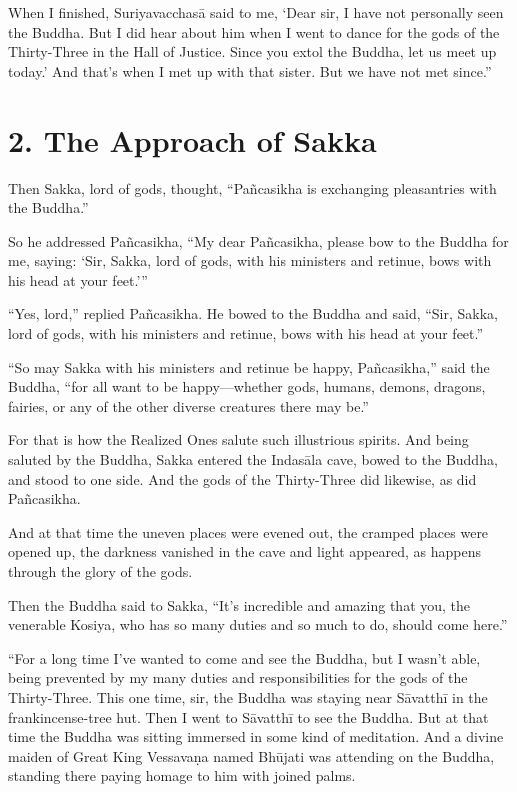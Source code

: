 \documentclass[12pt,openany]{book}%
\begin{document}
When I finished, \textsanskrit{Suriyavacchasā} said to me, ‘Dear sir, I have not personally seen the Buddha. But I did hear about him when I went to dance for the gods of the Thirty-Three in the Hall of Justice. Since you extol the Buddha, let us meet up today.’ And that’s when I met up with that sister. But we have not met since.” 

\section*{2. The Approach of Sakka }

Then Sakka, lord of gods, thought, “\textsanskrit{Pañcasikha} is exchanging pleasantries with the Buddha.” 

So he addressed \textsanskrit{Pañcasikha}, “My dear \textsanskrit{Pañcasikha}, please bow to the Buddha for me, saying: ‘Sir, Sakka, lord of gods, with his ministers and retinue, bows with his head at your feet.’” 

“Yes, lord,” replied \textsanskrit{Pañcasikha}. He bowed to the Buddha and said, “Sir, Sakka, lord of gods, with his ministers and retinue, bows with his head at your feet.” 

“So may Sakka with his ministers and retinue be happy, \textsanskrit{Pañcasikha},” said the Buddha, “for all want to be happy—whether gods, humans, demons, dragons, fairies, or any of the other diverse creatures there may be.” 

For that is how the Realized Ones salute such illustrious spirits. And being saluted by the Buddha, Sakka entered the \textsanskrit{Indasāla} cave, bowed to the Buddha, and stood to one side. And the gods of the Thirty-Three did likewise, as did \textsanskrit{Pañcasikha}. 

And at that time the uneven places were evened out, the cramped places were opened up, the darkness vanished in the cave and light appeared, as happens through the glory of the gods. 

Then the Buddha said to Sakka, “It’s incredible and amazing that you, the venerable Kosiya, who has so many duties and so much to do, should come here.” 

“For a long time I’ve wanted to come and see the Buddha, but I wasn’t able, being prevented by my many duties and responsibilities for the gods of the Thirty-Three. This one time, sir, the Buddha was staying near \textsanskrit{Sāvatthī} in the frankincense-tree hut. Then I went to \textsanskrit{Sāvatthī} to see the Buddha. But at that time the Buddha was sitting immersed in some kind of meditation. And a divine maiden of Great King \textsanskrit{Vessavaṇa} named \textsanskrit{Bhūjati} was attending on the Buddha, standing there paying homage to him with joined palms. 
\end{document}
